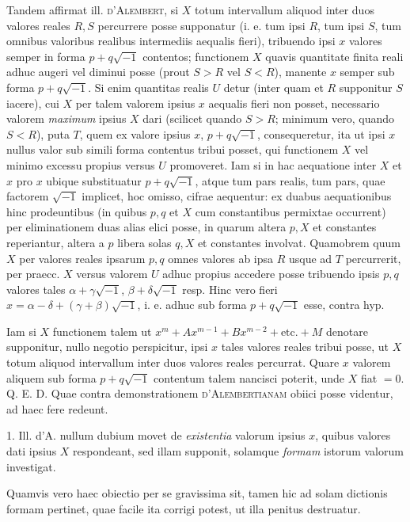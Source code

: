 Tandem affirmat ill. \textsc{d'Alembert}, si $X$ totum intervallum aliquod inter duos
valores reales $R,S$ percurrere posse supponatur (i. e. tum ipsi $R$, tum ipsi $S$,
tum omnibus valoribus realibus intermediis aequalis fieri), tribuendo ipsi $x$ valores semper in forma $p+q\sqrt{-1}$ contentos; functionem $X$ quavis quantitate finita reali adhuc augeri vel diminui posse (prout $S>R$ vel $S<R$), manente $x$
semper sub forma $p+q\sqrt{-1}$. Si enim quantitas realis $U$ detur (inter quam
et $R$ supponitur $S$ iacere), cui $X$ per talem valorem ipsius $x$ aequalis fieri non
posset, necessario valorem \textit{maximum} ipsius $X$ dari (scilicet quando $S>R$; minimum vero, quando $S<R$), puta $T$, quem ex valore ipsius $x$, $p+q\sqrt{-1}$,
consequeretur, ita ut ipsi $x$ nullus valor sub simili forma contentus tribui posset,
qui functionem $X$ vel minimo excessu propius versus $U$ promoveret. Iam si in
hac aequatione inter $X$ et $x$ pro $x$ ubique substituatur $p+q\sqrt{-1}$, atque tum pars
realis, tum pars, quae factorem $\sqrt{-1}$ implicet, hoc omisso, cifrae aequentur:
ex duabus aequationibus hinc prodeuntibus (in quibus $p,q$ et $X$ cum constantibus permixtae occurrent) per eliminationem duas alias elici posse, in quarum altera $p,X$ et constantes reperiantur, altera a $p$ libera solas $q,X$ et constantes
involvat. Quamobrem quum $X$ per valores reales ipsarum $p,q$ omnes valores ab
ipsa $R$ usque ad $T$ percurrerit, per praecc. $X$ versus valorem $U$ adhuc propius accedere posse tribuendo ipsis $p,q$ valores tales $\alpha+\gamma\sqrt{-1}$, $\beta+\delta\sqrt{-1}$ resp. Hinc
vero fieri $x=\alpha-\delta+(\gamma+\beta)\sqrt{-1}$, i. e. adhuc sub forma $p+q\sqrt{-1}$ esse, contra hyp.

Iam si $X$ functionem talem ut $x^m+Ax^{m-1}+Bx^{m-2}+\text{etc.}+M$ denotare supponitur, nullo negotio perspicitur, ipsi $x$ tales valores reales tribui posse,
ut $X$ totum aliquod intervallum inter duos valores reales percurrat. Quare $x$
valorem aliquem sub forma $p+q\sqrt{-1}$ contentum talem nancisci poterit,
unde $X$ fiat $=0$. Q. E. D.
Quae contra demonstrationem \textsc{d'Alembertianam} obiici posse videntur, ad
haec fere redeunt.

1. Ill. d'A. nullum dubium movet de \textit{existentia} valorum ipsius $x$, quibus valores dati ipsius $X$ respondeant, sed illam supponit, solamque \textit{formam} istorum
valorum investigat.

Quamvis vero haec obiectio per se gravissima sit, tamen hic ad solam dictionis formam pertinet, quae facile ita corrigi potest, ut illa penitus destruatur.

